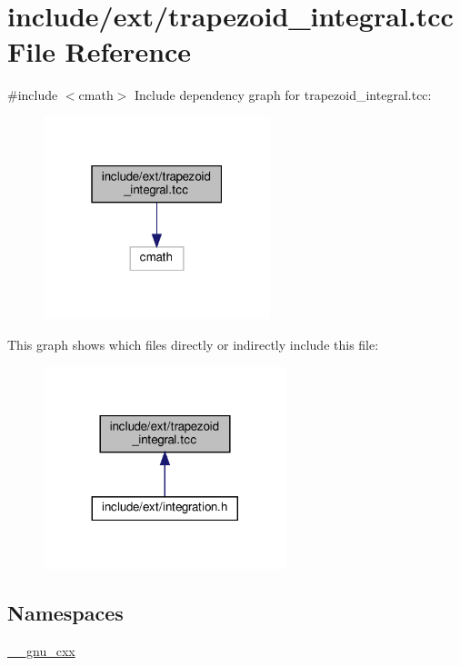 \hypertarget{trapezoid__integral_8tcc}{}\section{include/ext/trapezoid\+\_\+integral.tcc File Reference}
\label{trapezoid__integral_8tcc}
{\ttfamily \#include $<$cmath$>$}\newline
Include dependency graph for trapezoid\+\_\+integral.\+tcc\+:
\nopagebreak
\begin{figure}[H]
\begin{center}
\leavevmode
\includegraphics[width=187pt]{trapezoid__integral_8tcc__incl}
\end{center}
\end{figure}
This graph shows which files directly or indirectly include this file\+:
\nopagebreak
\begin{figure}[H]
\begin{center}
\leavevmode
\includegraphics[width=200pt]{trapezoid__integral_8tcc__dep__incl}
\end{center}
\end{figure}
\subsection*{Namespaces}
\begin{DoxyCompactItemize}
\item 
 \hyperlink{namespace____gnu__cxx}{\+\_\+\+\_\+gnu\+\_\+cxx}
\end{DoxyCompactItemize}
